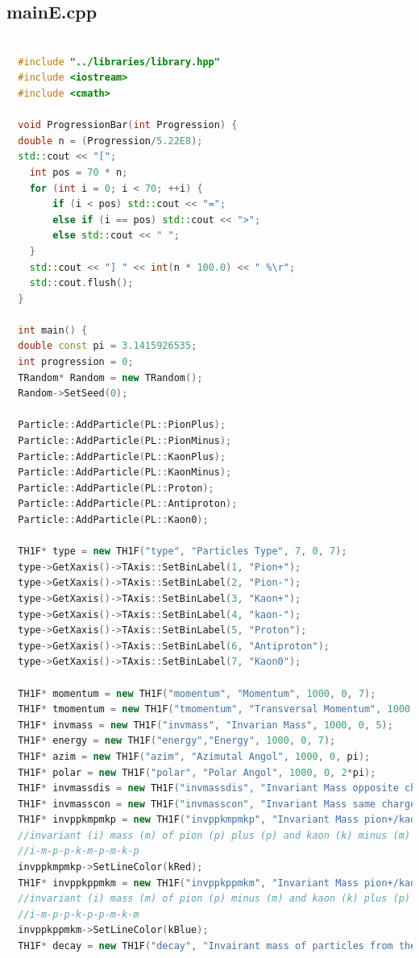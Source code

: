 \documentclass[a4paper, 11pt]{article}
\begin{document}
      \subsection{mainE.cpp}
        \begin{lstlisting}[language=c++, style=code]

  #include "../libraries/library.hpp"
  #include <iostream>
  #include <cmath>

  void ProgressionBar(int Progression) {
  double n = (Progression/5.22E8);
  std::cout << "[";
    int pos = 70 * n;
    for (int i = 0; i < 70; ++i) {
        if (i < pos) std::cout << "=";
        else if (i == pos) std::cout << ">";
        else std::cout << " ";
    }
    std::cout << "] " << int(n * 100.0) << " %\r";
    std::cout.flush();
  }

  int main() {
  double const pi = 3.1415926535;
  int progression = 0;
  TRandom* Random = new TRandom();
  Random->SetSeed(0);

  Particle::AddParticle(PL::PionPlus);
  Particle::AddParticle(PL::PionMinus);
  Particle::AddParticle(PL::KaonPlus);
  Particle::AddParticle(PL::KaonMinus);
  Particle::AddParticle(PL::Proton);
  Particle::AddParticle(PL::Antiproton);
  Particle::AddParticle(PL::Kaon0);

  TH1F* type = new TH1F("type", "Particles Type", 7, 0, 7);
  type->GetXaxis()->TAxis::SetBinLabel(1, "Pion+");
  type->GetXaxis()->TAxis::SetBinLabel(2, "Pion-");
  type->GetXaxis()->TAxis::SetBinLabel(3, "Kaon+");
  type->GetXaxis()->TAxis::SetBinLabel(4, "kaon-");
  type->GetXaxis()->TAxis::SetBinLabel(5, "Proton");
  type->GetXaxis()->TAxis::SetBinLabel(6, "Antiproton");
  type->GetXaxis()->TAxis::SetBinLabel(7, "Kaon0");

  TH1F* momentum = new TH1F("momentum", "Momentum", 1000, 0, 7);
  TH1F* tmomentum = new TH1F("tmomentum", "Transversal Momentum", 1000, 0, 7);
  TH1F* invmass = new TH1F("invmass", "Invarian Mass", 1000, 0, 5);
  TH1F* energy = new TH1F("energy","Energy", 1000, 0, 7);
  TH1F* azim = new TH1F("azim", "Azimutal Angol", 1000, 0, pi);
  TH1F* polar = new TH1F("polar", "Polar Angol", 1000, 0, 2*pi);
  TH1F* invmassdis = new TH1F("invmassdis", "Invariant Mass opposite charges", 1000, 0, 5);
  TH1F* invmasscon = new TH1F("invmasscon", "Invariant Mass same charges", 1000, 0, 5);
  TH1F* invppkmpmkp = new TH1F("invppkmpmkp", "Invariant Mass pion+/kaon- & pion-/kaon+", 1000, 0, 5);
  //invariant (i) mass (m) of pion (p) plus (p) and kaon (k) minus (m) or pion (p) minus (m) and kaon (k) plus (p)
  //i-m-p-p-k-m-p-m-k-p
  invppkmpmkp->SetLineColor(kRed);
  TH1F* invppkppmkm = new TH1F("invppkppmkm", "Invariant Mass pion+/kaon+ & pion-/kaon-", 1000, 0, 5);
  //invariant (i) mass (m) of pion (p) minus (m) and kaon (k) plus (p) or pion (p) minus (m) and kaon (k) minus (k)
  //i-m-p-p-k-p-p-m-k-m
  invppkppmkm->SetLineColor(kBlue);
  TH1F* decay = new TH1F("decay", "Invairant mass of particles from the decay", 1000, 0, 5);


\end{lstlisting}
\end{document}
